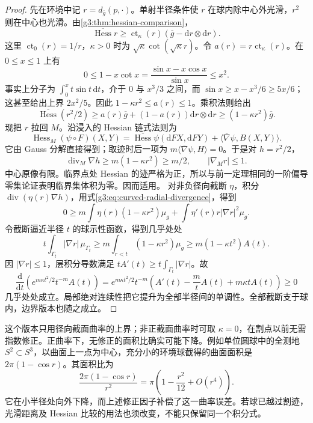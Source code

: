 \begin{proof}
	先在环境中记 \(r=d_{\overline g}(p,\cdot)\)。单射半径条件使 \(r\) 在球内除中心外光滑，\(r^2\) 则在中心也光滑。由\cref{g3:thm:hessian-comparison}，
	\[
		\overline{\operatorname{Hess}}r
		\ge\operatorname{ct}_\kappa(r)
		(\overline g-\mathrm dr\otimes\mathrm dr).
	\]
	这里 \(\operatorname{ct}_0(r)=1/r\)，\(\kappa>0\) 时为
	\(\sqrt\kappa\cot(\sqrt\kappa r)\)。令 \(a(r)=r\operatorname{ct}_\kappa(r)\)。在 \(0\le x\le1\) 上有
	\[
		0\le1-x\cot x
		=\frac{\sin x-x\cos x}{\sin x}
		\le x^2.
	\]
	事实上分子为 \(\int_0^x t\sin t\,\mathrm dt\)，介于 \(0\) 与 \(x^3/3\) 之间，而 \(\sin x\ge x-x^3/6\ge5x/6\)；这甚至给出上界 \(2x^2/5\)。因此 \(1-\kappa r^2\le a(r)\le1\)。乘积法则给出
	\[
		\overline{\operatorname{Hess}}(r^2/2)
		\ge a(r)\overline g+(1-a(r))\mathrm dr\otimes\mathrm dr
		\ge(1-\kappa r^2)\overline g.
	\]
	现把 \(r\) 拉回 \(M\)。沿浸入的 Hessian 链式法则为
	\[
		\operatorname{Hess}_M(\psi\circ F)(X,Y)
		=\overline{\operatorname{Hess}}\psi(\mathrm dF X,\mathrm dF Y)
		+\langle\overline\nabla\psi,B(X,Y)\rangle.
	\]
	它由 Gauss 分解直接得到；取迹时后一项为 \(m\langle\overline\nabla\psi,H\rangle=0\)。于是对 \(h=r^2/2\)，
	\begin{equation}\label{g3:eq:curved-radial-divergence}
		\operatorname{div}_M\nabla h\ge m(1-\kappa r^2)\ge m/2,
		\qquad |\nabla_Mr|\le1.
	\end{equation}
	中心原像有限。临界点处 Hessian 的迹严格为正，所以与前一定理相同的一阶偏导零集论证表明临界集体积为零。因而适用。
	对非负径向截断 \(\eta\)，积分 \(\operatorname{div}(\eta(r)\nabla h)\)，用式\eqref{g3:eq:curved-radial-divergence}，得到
	\[
		0\ge m\int\eta(r)(1-\kappa r^2)\mu_g
		+\int\eta'(r)r|\nabla r|^2\mu_g.
	\]
	令截断逼近半径 \(t\) 的球示性函数，得到几乎处处
	\[
		t\int_{\Gamma_t}|\nabla r|\,\mu_{\Gamma_t}
		\ge m\int_{r<t}(1-\kappa r^2)\mu_g
		\ge m(1-\kappa t^2)A(t).
	\]
	因 \(|\nabla r|\le1\)，层积分导数满足
	\(tA'(t)\ge t\int_{\Gamma_t}|\nabla r|\)。故
	\[
		\frac{\mathrm d}{\mathrm dt}\left(e^{m\kappa t^2/2}t^{-m}A(t)\right)
		=e^{m\kappa t^2/2}t^{-m}
		\left(A'(t)-\frac m t A(t)+m\kappa t A(t)\right)\ge0
	\]
	几乎处处成立。局部绝对连续性把它提升为全部半径间的单调性。全部截断支于球内，边界版本也随之成立。
\end{proof}

这个版本只用径向截面曲率的上界；非正截面曲率时可取 \(\kappa=0\)，在割点以前无需指数修正。正曲率下，无修正的面积比确实可能下降。例如单位圆球中的全测地 \(S^2\subset S^3\)，以曲面上一点为中心，充分小的环境球截得的曲面面积是 \(2\pi(1-\cos r)\)。其面积比为
\[
	\frac{2\pi(1-\cos r)}{r^2}
	=\pi\left(1-\frac{r^2}{12}+O(r^4)\right).
\]
它在小半径处向外下降，而上述修正因子补偿了这一曲率误差。若球已越过割迹，光滑距离及 Hessian 比较的用法也须改变，不能只保留同一个积分式。

